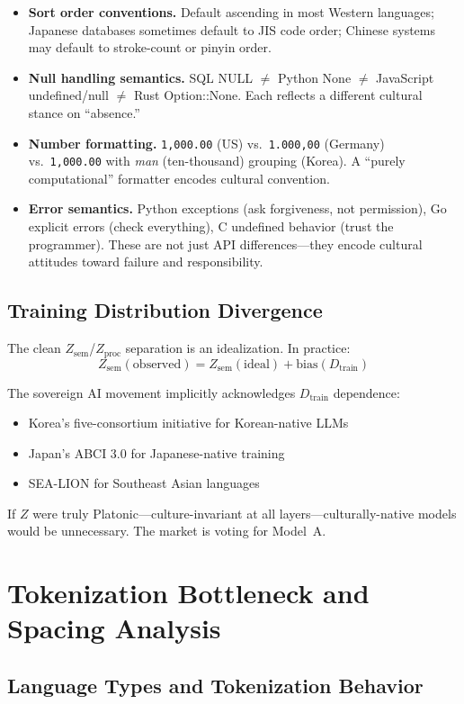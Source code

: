 \documentclass[11pt]{article}
\theoremstyle{definition}
\newcommand{\Zsem}{Z_{\text{sem}}}
\newcommand{\Zproc}{Z_{\text{proc}}}
\newcommand{\Dtrain}{D_{\text{train}}}
\begin{document}
\begin{itemize}[nosep]
  \item \textbf{Sort order conventions.} Default ascending in most Western languages; Japanese databases sometimes default to JIS code order; Chinese systems may default to stroke-count or pinyin order.
  \item \textbf{Null handling semantics.} SQL NULL $\neq$ Python None $\neq$ JavaScript undefined/null $\neq$ Rust Option::None. Each reflects a different cultural stance on ``absence.''
  \item \textbf{Number formatting.} \texttt{1,000.00} (US) vs.\ \texttt{1.000,00} (Germany) vs.\ \texttt{1,000.00} with \emph{man} (ten-thousand) grouping (Korea). A ``purely computational'' formatter encodes cultural convention.
  \item \textbf{Error semantics.} Python exceptions (ask forgiveness, not permission), Go explicit errors (check everything), C undefined behavior (trust the programmer). These are not just API differences---they encode cultural attitudes toward failure and responsibility.
\end{itemize}

\subsection{Training Distribution Divergence}

The clean $\Zsem$/$\Zproc$ separation is an idealization. In practice:
\[
\Zsem(\text{observed}) = \Zsem(\text{ideal}) + \mathrm{bias}(\Dtrain)
\]

The sovereign AI movement implicitly acknowledges $\Dtrain$ dependence:
\begin{itemize}[nosep]
  \item Korea's five-consortium initiative for Korean-native LLMs
  \item Japan's ABCI 3.0 for Japanese-native training
  \item SEA-LION for Southeast Asian languages
\end{itemize}
If $Z$ were truly Platonic---culture-invariant at all layers---culturally-native models would be unnecessary. The market is voting for Model~A.

\section{Tokenization Bottleneck and Spacing Analysis}\label{app:tokenization}

\subsection{Language Types and Tokenization Behavior}
\end{document}
